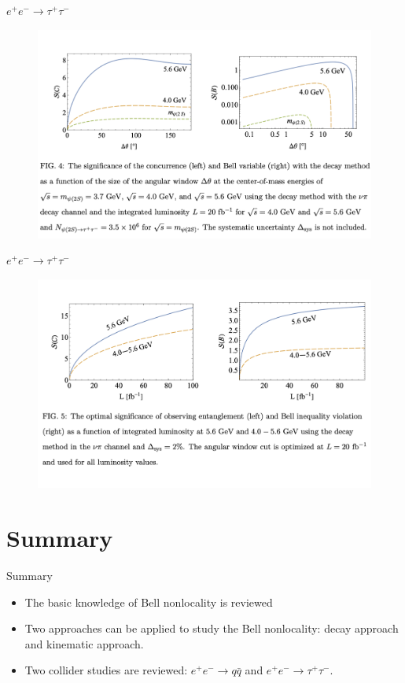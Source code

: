 \documentclass{beamer}
\begin{document}
    \begin{frame}{$e^+e^-\to \tau^+\tau^-$ \footnotesize {}}
        \begin{figure}[htbp]
            \centering
            \includegraphics[width=0.8\linewidth]{img/eetautau7.png}
        \end{figure}
    \end{frame}

    \begin{frame}{$e^+e^-\to \tau^+\tau^-$ \footnotesize {}}
        \begin{figure}[htbp]
            \centering
            \includegraphics[width=0.8\linewidth]{img/eetautau8.png}
        \end{figure}
    \end{frame}

    \section{Summary}

    \begin{frame}{Summary}
        \begin{itemize}
            \item The basic knowledge of Bell nonlocality is reviewed
            \item Two approaches can be applied to study the Bell nonlocality: decay approach and kinematic approach.
            \item Two collider studies are reviewed: $e^+e^-\to q\bar{q}$ and $e^+e^-\to \tau^+\tau^-$.
        \end{itemize}
    \end{frame}

    \QApage
\end{document}
